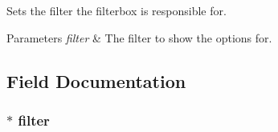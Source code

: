 Sets the filter the filterbox is responsible for. 


\begin{DoxyParams}{Parameters}
{\em filter} & The filter to show the options for.\\
\hline
\end{DoxyParams}


\subsection{Field Documentation}
\hypertarget{classGUI_1_1FilterConfigurationBox_ae919e8286e640d26bcfff7f66cc77ef4}{}
\subsubsection[{filter}]{$\ast$ filter\hspace{0.3cm}{\ttfamily [protected]}}\label{classGUI_1_1FilterConfigurationBox_ae919e8286e640d26bcfff7f66cc77ef4}
